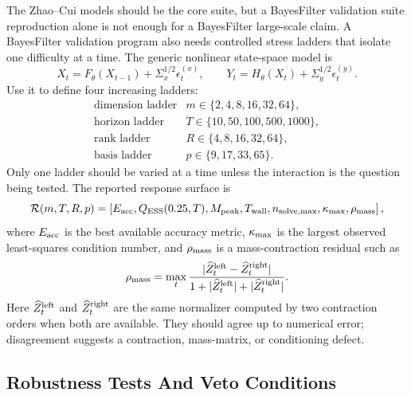 \documentclass[11pt]{article}
\numberwithin{equation}{section}
\begin{document}
The Zhao--Cui models should be the core suite, but a BayesFilter validation
suite reproduction alone is not enough for a BayesFilter large-scale claim.  A
BayesFilter validation program also needs controlled stress ladders that
isolate one difficulty at a time.
The generic nonlinear state-space model is
\begin{equation}
    X_t=F_\theta(X_{t-1})+\Sigma_x^{1/2}\epsilon_t^{(x)},
    \qquad
    Y_t=H_\theta(X_t)+\Sigma_y^{1/2}\epsilon_t^{(y)}.
    \label{eq:p27-bf1}
\end{equation}
Use it to define four increasing ladders:
\begin{equation}
\begin{array}{ll}
\text{dimension ladder} &
    m\in\{2,4,8,16,32,64\},\\[1mm]
\text{horizon ladder} &
    T\in\{10,50,100,500,1000\},\\[1mm]
\text{rank ladder} &
    R\in\{4,8,16,32,64\},\\[1mm]
\text{basis ladder} &
    p\in\{9,17,33,65\}.
\end{array}
\label{eq:p27-bf2}
\end{equation}
Only one ladder should be varied at a time unless the interaction is the
question being tested.  The reported response surface is
\begin{equation}
    \mathcal R(m,T,R,p)
    =
    \left[
    E_{\rm acc},
    Q_{\rm ESS}(0.25,T),
    M_{\rm peak},
    T_{\rm wall},
    n_{\rm solve,max},
    \kappa_{\rm max},
    \rho_{\rm mass}
    \right],
    \label{eq:p27-bf3}
\end{equation}
where \(E_{\rm acc}\) is the best available accuracy metric,
\(\kappa_{\rm max}\) is the largest observed least-squares condition number,
and \(\rho_{\rm mass}\) is a mass-contraction residual such as
\begin{equation}
    \rho_{\rm mass}
    =
    \max_t
    \frac{
    |\widehat Z_t^{\rm left}-\widehat Z_t^{\rm right}|}
    {1+|\widehat Z_t^{\rm left}|+|\widehat Z_t^{\rm right}|}.
    \label{eq:p27-bf4}
\end{equation}
Here \(\widehat Z_t^{\rm left}\) and \(\widehat Z_t^{\rm right}\) are the same
normalizer computed by two contraction orders when both are available.  They
should agree up to numerical error; disagreement suggests a contraction,
mass-matrix, or conditioning defect.

\subsection{Robustness Tests And Veto Conditions}
\end{document}
